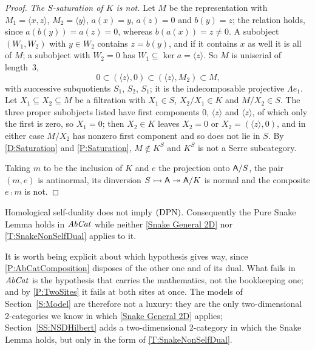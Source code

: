 \begin{proof}
	\emph{The \(S\)-saturation of \(K\) is not.} Let \(M\) be the representation with \(M_{1}=\langle x,z\rangle\), \(M_{2}=\langle y\rangle\), \(a(x)=y\), \(a(z)=0\) and \(b(y)=z\); the relation holds, since \(a(b(y))=a(z)=0\), whereas \(b(a(x))=z\neq0\). A subobject \((W_{1},W_{2})\) with \(y\in W_{2}\) contains \(z=b(y)\), and if it contains \(x\) as well it is all of \(M\); a subobject with \(W_{2}=0\) has \(W_{1}\subseteq\ker a=\langle z\rangle\). So \(M\) is uniserial of length~3,
	\[
		0\subset(\langle z\rangle,0)\subset(\langle z\rangle,M_{2})\subset M\text{,}
	\]
	with successive subquotients \(S_{1}\), \(S_{2}\), \(S_{1}\); it is the indecomposable projective \(\Lambda e_{1}\). Let \(X_{1}\subseteq X_{2}\subseteq M\) be a filtration with \(X_{1}\in S\), \(X_{2}/X_{1}\in K\) and \(M/X_{2}\in S\). The three proper subobjects listed have first components \(0\), \(\langle z\rangle\) and \(\langle z\rangle\), of which only the first is zero, so \(X_{1}=0\); then \(X_{2}\in K\) leaves \(X_{2}=0\) or \(X_{2}=(\langle z\rangle,0)\), and in either case \(M/X_{2}\) has nonzero first component and so does not lie in \(S\). By \ref{D:Saturation} and \prox\ref{P:Saturation}, \(M\notin K^{S}\) and \(K^{S}\) is not a Serre subcategory.

	Taking \(m\) to be the inclusion of \(K\) and \(e\) the projection onto \(\mathsf{A}/S\), the pair \((m,e)\) is antinormal, its dinversion \(S\rightarrowtail\mathsf{A}\twoheadrightarrow\mathsf{A}/K\) is normal and the composite \(e\comp m\) is not.
\end{proof}

\begin{corollary}
  \label{C:HSDstrict} 
  Homological self-duality does not imply \(\textup{(DPN)}\). Consequently the Pure Snake Lemma holds in \(\mathit{AbCat}\) while neither \thex\ref{Snake General 2D} nor \thex\ref{T:SnakeNonSelfDual} applies to it.
\end{corollary}

\begin{remark}
  \label{Rem NSD AbCatWhich}
  It is worth being explicit about which hypothesis gives way, since \prox\ref{P:AbCatComposition} disposes of the other one and of its dual. What fails in \(\mathit{AbCat}\) is the hypothesis that carries the mathematics, not the bookkeeping one; and by \prox\ref{P:TwoSites} it fails at both sites at once. The models of Section~\ref{S:Model} are therefore not a luxury: they are the only two-dimensional 2-categories we know in which \thex\ref{Snake General 2D} applies; Section~\ref{SS:NSDHilbert} adds a two-dimensional 2-category in which the Snake Lemma holds, but only in the form of \thex\ref{T:SnakeNonSelfDual}.
\end{remark}

